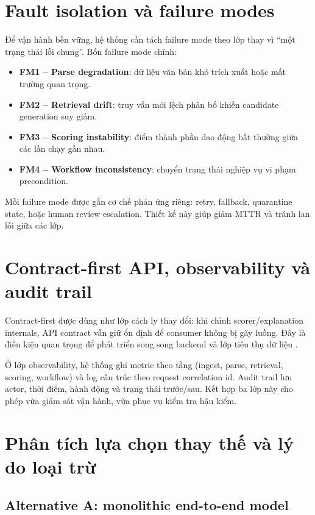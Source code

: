 \section{Fault isolation và failure modes}

Để vận hành bền vững, hệ thống cần tách failure mode theo lớp thay vì ``một trạng thái lỗi chung''. Bốn failure mode chính:

\begin{itemize}
  \item \textbf{FM1 -- Parse degradation}: dữ liệu văn bản khó trích xuất hoặc mất trường quan trọng.
  \item \textbf{FM2 -- Retrieval drift}: truy vấn mới lệch phân bố khiến candidate generation suy giảm.
  \item \textbf{FM3 -- Scoring instability}: điểm thành phần dao động bất thường giữa các lần chạy gần nhau.
  \item \textbf{FM4 -- Workflow inconsistency}: chuyển trạng thái nghiệp vụ vi phạm precondition.
\end{itemize}

Mỗi failure mode được gắn cơ chế phản ứng riêng: retry, fallback, quarantine state, hoặc human review escalation. Thiết kế này giúp giảm MTTR và tránh lan lỗi giữa các lớp.

\section{Contract-first API, observability và audit trail}

Contract-first được dùng như lớp cách ly thay đổi: khi chỉnh scorer/explanation internals, API contract vẫn giữ ổn định để consumer không bị gãy luồng. Đây là điều kiện quan trọng để phát triển song song backend và lớp tiêu thụ dữ liệu \cite{hld-api,lld-api}.

Ở lớp observability, hệ thống ghi metric theo tầng (ingest, parse, retrieval, scoring, workflow) và log cấu trúc theo request correlation id. Audit trail lưu actor, thời điểm, hành động và trạng thái trước/sau. Kết hợp ba lớp này cho phép vừa giám sát vận hành, vừa phục vụ kiểm tra hậu kiểm.

\section{Phân tích lựa chọn thay thế và lý do loại trừ}

\subsection{Alternative A: monolithic end-to-end model}

